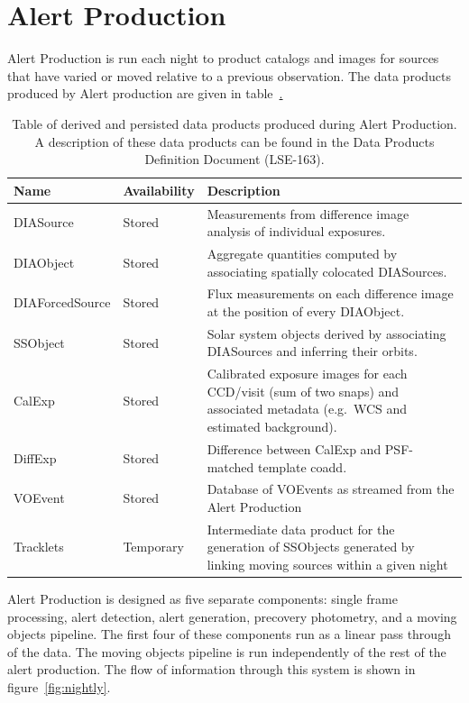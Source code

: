 \section{Alert Production}
\label{sec:ap}



Alert Production is run each night to product catalogs and images for sources that have varied or moved relative to a previous observation.  The data products produced by Alert production are given in  table~\hyperref[table:ap_data_products].

\begin{table}
\small
\begin{tabularx}{\textwidth}{ | l | l | X | }
  \hline
  {\bf Name} & {\bf Availability} & {\bf Description} \\
  \hline
  DIASource & Stored &
  Measurements from difference image analysis of individual exposures. \\
  \hline
  DIAObject& Stored &
  Aggregate quantities computed by associating spatially colocated DIASources. \\
  \hline
  DIAForcedSource & Stored &
  Flux measurements on each difference image at the position of every DIAObject. \\
  \hline
  SSObject & Stored &
  Solar system objects derived by associating DIASources and inferring their orbits. \\
  \hline
  CalExp & Stored &
  Calibrated exposure images for each CCD/visit (sum of two snaps) and associated metadata (e.g.\ WCS and estimated background). \\
  \hline 
  DiffExp & Stored &
  Difference between CalExp and PSF-matched template coadd. \\
  \hline 
  VOEvent & Stored &
  Database of VOEvents as streamed from the Alert Production\\
Tracklets & Temporary &
  Intermediate data product for the generation of SSObjects generated by linking moving sources within a given night \\


  \hline
\end{tabularx}
\caption{Table of derived and persisted data products produced during  Alert Production.  A description of these data products can be found in the Data Products Definition Document (LSE-163).
\label{table:ap_data_products}}
\end{table}


Alert Production is designed as five separate components: single frame processing, alert detection, alert generation, precovery photometry, and a moving objects pipeline. The first four of these components run as a linear pass through of the data. The moving objects pipeline is run independently of the rest of the alert production. The flow of information through this system is shown in figure~\ref{fig:nightly}.

